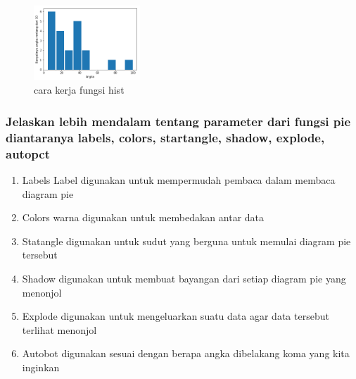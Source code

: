 
\begin{figure}[ht]	
    \includegraphics[width=4cm]{figures/6/1174083/Teori/7.png}
    \centering
    \caption{cara kerja fungsi hist}
    \label{6}
\end{figure}
\newpage
\subsubsection{Jelaskan lebih mendalam tentang parameter dari fungsi pie diantaranya labels, colors, startangle, shadow, explode, autopct}
\begin{enumerate}
\item Labels Label digunakan untuk mempermudah pembaca dalam membaca diagram pie
\item Colors  warna digunakan untuk membedakan antar data
\item Statangle digunakan untuk sudut yang berguna untuk memulai diagram pie tersebut
\item Shadow digunakan untuk membuat bayangan dari setiap diagram pie yang menonjol
\item Explode digunakan untuk mengeluarkan suatu data agar data tersebut terlihat menonjol
\item Autobot digunakan sesuai dengan berapa angka dibelakang koma yang kita inginkan
\end{enumerate}
